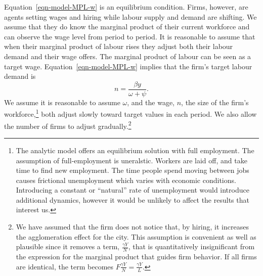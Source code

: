 Equation~\ref{eqn-model-MPL-w} is an equilibrium condition. Firms, however,  are agents setting wages and hiring while labour supply and demand are shifting.    We assume that they do know the marginal product of their current workforce and can observe the wage level from period to period. It is reasonable to assume that when their marginal product of labour rises they adjust both their labour demand and their wage offers. The marginal product of labour can be seen as a target wage. Equation~\ref{eqn-model-MPL-w} implies that the firm's target labour demand is 
\begin{equation}
           n  = \frac{\beta y}{\omega + \psi}.
\label{eqn-labour-demand}
\end{equation}
We assume it is reasonable to assume $\omega$, and the wage, $n$, the size of the firm's workforce,\footnote{The analytic model offers an equilibrium solution with full employment. The assumption of full-employment is uneralstic. Workers are laid off, and take time to find new employment. The time people spend moving between jobs causes frictional unemployment which varies with economic conditions. Introducing a constant or ``natural'' rate of unemployment %
would introduce additional dynamics, however it would be unlikely to affect the results that interest us.} 
both adjust slowly toward target values in each period. We also allow the number of firms to adjust gradually.\footnote{We have assumed that the firm does not notice that, by hiring, it increases the agglomeration effect for the city. This assumption is convenient as well as plausible since it removes a term, $\frac{\gamma Y}{N}$, that is quantitatively insignificant from the expression for the marginal product that guides firm behavior. If all firms are identical, the term becomes $F\frac{\gamma Y}{N} =\frac{\gamma Y}{L}$.}



